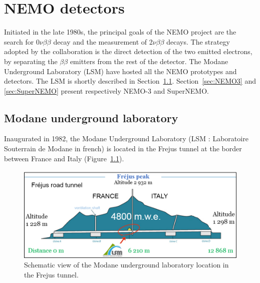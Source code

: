 \documentclass[main.tex]{subfiles}
\begin{document}
\chapter{NEMO detectors}




\NI Initiated in the late 1980s, the principal goals of the NEMO project are the search for 0$\nu\beta\beta$ decay and the measurement of 2$\nu\beta\beta$ decays. The strategy adopted by the collaboration is the direct detection of the two emitted electrons, by separating the $\beta\beta$ emitters from the rest of the detector. The Modane Underground Laboratory (LSM) have hosted all the NEMO prototypes and detectors. The LSM is shortly described in Section~\ref{sec:LSM}. Section~\ref{sec:NEMO3} and \ref{sec:SuperNEMO} present respectively NEMO-3 and SuperNEMO.


\section{Modane underground laboratory}\label{sec:LSM}


\NI Inaugurated in 1982, the Modane Underground Laboratory (LSM : Laboratoire Souterrain de Modane in french) is located in the Frejus tunnel at the border between France and Italy (Figure~\ref{LSMtunnel}).


\bigskip


\begin{figure}[h!]
\begin{center}
\includegraphics[scale=0.50]{pictures/Chap3/LSMtunnel.png}
\caption{Schematic view of the Modane underground laboratory location in the Frejus tunnel.}
\label{LSMtunnel}
\end{center}
\end{figure}
\end{document}
